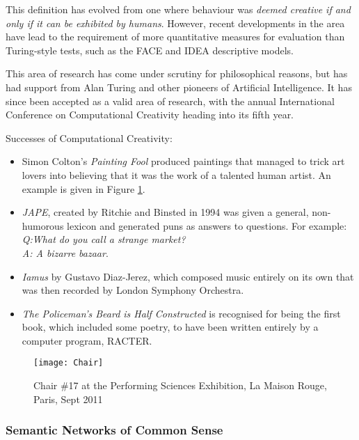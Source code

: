This definition has evolved from one where behaviour was \textit{deemed creative if and only if it can be exhibited by humans}\cite{wiggins2006searching}. However, recent developments in the area have lead to the requirement of more quantitative measures for evaluation than Turing-style tests, such as the FACE and IDEA descriptive models\cite{colton2011computational}.

This area of research has come under scrutiny for philosophical reasons, but has had support from Alan Turing and other pioneers of Artificial Intelligence. It has since been accepted as a valid area of research, with the annual International Conference on Computational Creativity heading into its fifth year.

Successes of Computational Creativity:
\begin{itemize}
\item{Simon Colton's \textit{Painting Fool}\cite{colton2012painting} produced paintings that managed to trick art lovers into believing that it was the work of a talented human artist. An example is given in Figure \ref{fig:chair}.}
\item{\textit{JAPE}\cite{binsted1997computational}, created by Ritchie and Binsted in 1994 was given a general, non-humorous lexicon and generated puns as answers to questions. For example:\\\textit{Q:What do you call a strange market?\\ A: A bizarre bazaar}.}
\item{\textit{Iamus} by Gustavo Diaz-Jerez\cite{diaz2011composing}, which composed music entirely on its own that was then recorded by London Symphony Orchestra.}
\item{\textit{The Policeman's Beard is Half Constructed}\cite{chamberlain1984policeman} is recognised for being the first book, which included some poetry, to have been written entirely by a computer program, RACTER.}
\end{itemize} 

\begin{figure}[h!]
\centering
\texttt{[image: Chair]}
\caption{Chair \#17 at the Performing Sciences Exhibition, La Maison Rouge, Paris, Sept 2011}
\label{fig:chair}
\end{figure}

\subsubsection{Semantic Networks of Common Sense}
\label{sec:common-sense-bg}

